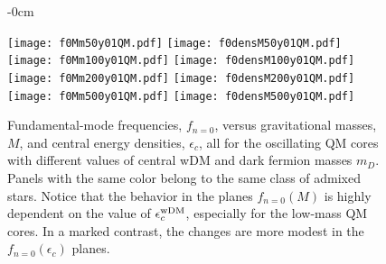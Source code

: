 \documentclass[universe,article,accept,moreauthors,pdftex]{Definitions/mdpi}
\begin{document}
\begin{figure}[H]\ContinuedFloat


\begin{adjustwidth}{-\extralength}{0cm}
\centering %

{\texttt{[image: f0Mm50y01QM.pdf]}\vspace{3pt}
	  \texttt{[image: f0densM50y01QM.pdf]}}\\\vspace{5pt}
{\texttt{[image: f0Mm100y01QM.pdf]}\vspace{1pt}
	  \texttt{[image: f0densM100y01QM.pdf]}}\\\vspace{5pt}
{\texttt{[image: f0Mm200y01QM.pdf]}\vspace{3pt}
	  \texttt{[image: f0densM200y01QM.pdf]}}\\\vspace{5pt}
{\texttt{[image: f0Mm500y01QM.pdf]}\vspace{3pt}
	  \texttt{[image: f0densM500y01QM.pdf]}}
\end{adjustwidth}
\caption{Fundamental-mode frequencies, $f_{n=0}$, versus gravitational masses, $M$, and central energy densities, $\epsilon_{c}$, all for the oscillating QM cores with different values of central wDM and dark fermion masses $m_{D}$. Panels with the same color belong to the same class of admixed stars. Notice that the behavior in the planes $f_{n=0}(M)$ is highly dependent on the value of $\epsilon^{\rm wDM}_{c}$, especially for the low-mass QM cores. In a marked contrast, the changes are more modest in the $f_{n=0}(\epsilon_{c})$ planes.}
\label{fig:f0Mdens01QM}%

\end{figure}
\end{document}
